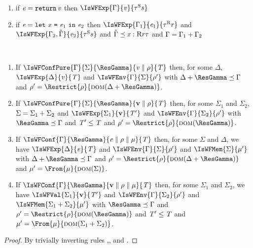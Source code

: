 \begin{lemma}
\begin{enumerate}
and  $\Graded{\tau_i}{\Rgr_i}{\rgr_i}\leq\T_i\Space \forall i\in 1..n$ and $\Sgr=\rzero$. \epa
%
%
\item \label{lem:inversion:ret} if $\mathit{e}=\texttt{return}\, \mathit{v}$ then $\IsWFExp{\Gamma}{\ve}{\Graded{\tau}{\Sgr}{\sgr}}$
%
%
\item\label{lem:inversionE:let}  if $\mathit{e}=\texttt{let}\ \mathit{x}\ \texttt{=}\ \mathit{e}_1\ \texttt{in}\ \mathit{e}_2$ then $\IsWFExp{\Gamma_1}{\e_1}{\Graded{\tau}{\Rgr}{\rgr}}$ and \bpa $\IsWFExp{\Gamma_2,\hat\Gamma}{\e_2}{\Graded{\tau}{\Sgr}{\sgr}}$ and   $\hat\Gamma\preceq\mathit{x} :\textsc{R}{r}{\tau}$ \epa and $\Gamma=\Gamma_1+\Gamma_2$ 
%
%
\end{enumerate}
\end{lemma}



\begin{lemma}\label{lem:inversionConf}\ 
\begin{enumerate}
\item\label{lem:inversionConf:pure:ve} If $\IsWFConfPure{\Gamma}{\Sigma}{\ResGamma}{\VConf{\ve}{\env}}{\T}$ then, for some $\Delta$,
$\IsWFExp{\Delta}{\ve}{\T}$ and $\IsWFEnv{\Gamma}{\Sigma}{\env'}$ with $\Delta\ctxsum\ResGamma\ctxord\Gamma$ and $\env'=\Restrict{\env}{\dom{\Delta\ctxsum\ResGamma}}$.
%
%
\item\label{lem:inversionConf:pure:res} If $\IsWFConfPure{\Gamma}{\Sigma}{\ResGamma}{\VConf{\val}{\env}}{\T}$ then, for some $\Sigma_1$ and $\Sigma_2$, $\Sigma=\Sigma_1+\Sigma_2$ and
$\IsWFExp{\Sigma_1}{\val}{\T'}$ and $\IsWFEnv{\Gamma}{\Sigma_2}{\env'}$ with $\ResGamma\ctxord\Gamma$ and $\mathit{T}'\leq\mathit{T}$ and $\env'=\Restrict{\env}{\dom{\ResGamma}}$.
%
%
\item\label{lem:inversionConf:exp:e} If $\IsWFConf{\Gamma}{\ResGamma}{\Conf{\e}{\env}{\mem}}{\T}$ then, for some $\Sigma$ and $\Delta$, we have $\IsWFExp{\Delta}{\e}{\T}$ and 
$\IsWFEnv{\Gamma}{\Sigma}{\env'}$ and $\IsWFMem{\Sigma}{\mem'}$ with $\Delta\ctxsum\ResGamma\ctxord\Gamma$ and
 $\env'=\Restrict{\env}{\dom{\Delta\ctxsum\ResGamma}}$  and  $\mem'=\From{\mem}{\dom{\Sigma}}$.
%
%
\item\label{lem:inversionConf:exp:res} If $\IsWFConf{\Gamma}{\ResGamma}{\Conf{\val}{\env}{\mem}}{\T}$ then, for some $\Sigma_1$ and $\Sigma_2$, we have $\IsWFVal{\Sigma_1}{\val}{\T'}$ and 
$\IsWFEnv{\Gamma}{\Sigma_2}{\env'}$ and $\IsWFMem{\Sigma_1\ctxsum\Sigma_2}{\mem'}$ with $\ResGamma\ctxord\Gamma$
and $\env'=\Restrict{\env}{\dom{\ResGamma}}$ and $\mathit{T}'\leq\mathit{T}$ and $\mem'=\From{\mem}{\dom{\Sigma_1\ctxsum\Sigma_2}}$.
\end{enumerate}
\end{lemma}
\begin{proof}
By trivially inverting rules ,, and .
\end{proof}


